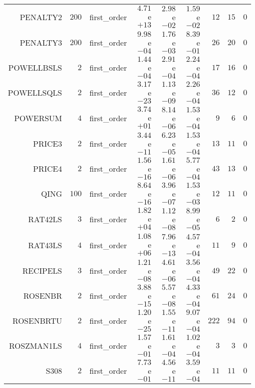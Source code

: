 \begin{longtable}{rrrrrrrrr}
PENALTY2 & \(   200\) & first\_order & \( 4.71\)e\(+13\) & \( 2.98\)e\(-02\) & \( 1.59\)e\(-02\) & \(    12\) & \(    15\) & \(     0\) \\
PENALTY3 & \(   200\) & first\_order & \( 9.98\)e\(-04\) & \( 1.76\)e\(-03\) & \( 8.39\)e\(-01\) & \(    26\) & \(    20\) & \(     0\) \\
POWELLBSLS & \(     2\) & first\_order & \( 1.44\)e\(-04\) & \( 2.91\)e\(-04\) & \( 2.24\)e\(-04\) & \(    17\) & \(    16\) & \(     0\) \\
POWELLSQLS & \(     2\) & first\_order & \( 3.17\)e\(-23\) & \( 1.13\)e\(-09\) & \( 2.26\)e\(-04\) & \(    36\) & \(    12\) & \(     0\) \\
POWERSUM & \(     4\) & first\_order & \( 3.74\)e\(+01\) & \( 8.14\)e\(-06\) & \( 1.53\)e\(-04\) & \(     9\) & \(     6\) & \(     0\) \\
PRICE3 & \(     2\) & first\_order & \( 3.44\)e\(-11\) & \( 6.23\)e\(-05\) & \( 1.53\)e\(-04\) & \(    13\) & \(    11\) & \(     0\) \\
PRICE4 & \(     2\) & first\_order & \( 1.56\)e\(-16\) & \( 1.61\)e\(-06\) & \( 5.77\)e\(-04\) & \(    43\) & \(    13\) & \(     0\) \\
QING & \(   100\) & first\_order & \( 8.64\)e\(-16\) & \( 3.96\)e\(-07\) & \( 1.53\)e\(-03\) & \(    12\) & \(    11\) & \(     0\) \\
RAT42LS & \(     3\) & first\_order & \( 1.82\)e\(+04\) & \( 1.12\)e\(-08\) & \( 8.99\)e\(-05\) & \(     6\) & \(     2\) & \(     0\) \\
RAT43LS & \(     4\) & first\_order & \( 1.08\)e\(+06\) & \( 7.96\)e\(-13\) & \( 4.57\)e\(-04\) & \(    11\) & \(     9\) & \(     0\) \\
RECIPELS & \(     3\) & first\_order & \( 1.21\)e\(-08\) & \( 4.61\)e\(-06\) & \( 3.56\)e\(-04\) & \(    49\) & \(    22\) & \(     0\) \\
ROSENBR & \(     2\) & first\_order & \( 3.88\)e\(-15\) & \( 5.57\)e\(-08\) & \( 4.33\)e\(-04\) & \(    61\) & \(    24\) & \(     0\) \\
ROSENBRTU & \(     2\) & first\_order & \( 1.20\)e\(-25\) & \( 1.55\)e\(-11\) & \( 9.07\)e\(-04\) & \(   222\) & \(    94\) & \(     0\) \\
ROSZMAN1LS & \(     4\) & first\_order & \( 1.57\)e\(-01\) & \( 1.61\)e\(-04\) & \( 1.02\)e\(-04\) & \(     3\) & \(     3\) & \(     0\) \\
S308 & \(     2\) & first\_order & \( 7.73\)e\(-01\) & \( 4.56\)e\(-11\) & \( 3.59\)e\(-04\) & \(    11\) & \(    11\) & \(     0\) \\

\end{longtable}
